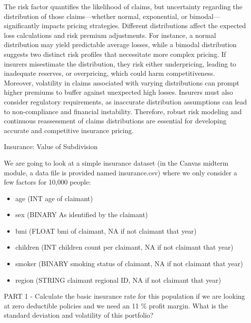 \documentclass[12pt]{exam}
\begin{document}
\begin{questions}
\begin{enumerate}
    The risk factor quantifies the likelihood of claims, but uncertainty regarding the distribution of those claims—whether normal, exponential, or bimodal—significantly impacts pricing strategies. Different distributions affect the expected loss calculations and risk premium adjustments. For instance, a normal distribution may yield predictable average losses, while a bimodal distribution suggests two distinct risk profiles that necessitate more complex pricing. If insurers misestimate the distribution, they risk either underpricing, leading to inadequate reserves, or overpricing, which could harm competitiveness.\\

    Moreover, volatility in claims associated with varying distributions can prompt higher premiums to buffer against unexpected high losses. Insurers must also consider regulatory requirements, as inaccurate distribution assumptions can lead to non-compliance and financial instability. Therefore, robust risk modeling and continuous reassessment of claims distributions are essential for developing accurate and competitive insurance pricing.\\
    
    
\end{enumerate}

\question[40] Insurance: Value of Subdivision
\addpoints

We are going to look at a simple insurance dataset (in the Canvas midterm module, a data file is provided named insurance.csv) where we only consider a few factors for 10,000 people: 

\begin{itemize}
    \item age (INT age of claimant)
    \item sex (BINARY As identified by the claimant)
    \item bmi (FLOAT bmi of claimant, NA if not claimant that year)
    \item children (INT children count per claimant, NA if not claimant that year)
    \item smoker (BINARY smoking status of claimant, NA if not claimant that year)
    \item region (STRING claimant regional ID, NA if not claimant that year)
\end{itemize}

PART 1 - Calculate the basic insurance rate for this population if we are looking at zero deductible policies and we need an 11 \% profit margin. What is the standard deviation and volatility of this portfolio?\\


\end{questions}
\end{document}
